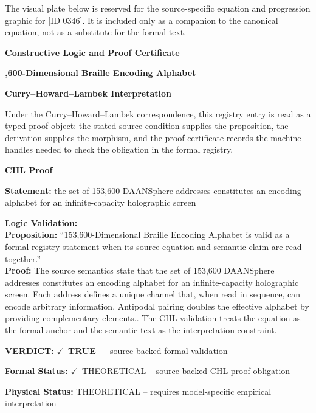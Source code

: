 \begingroup\footnotesize\sloppy
The visual plate below is reserved for the source-specific equation and progression graphic for [ID 0346]. It is included only as a companion to the canonical equation, not as a substitute for the formal text.
\par\endgroup
\ifTZPDarkEdition
{}
\fi

\clearpage
\begingroup\tzpsupportsetup
\noindent\textbf{\fontsize{10.8pt}{12.8pt}\selectfont [ID 0346] Constructive Logic and Proof Certificate}\par
\noindent\textbf{\fontsize{10pt}{12pt},600-Dimensional Braille Encoding Alphabet}\par
\vspace{0.45em}
\begingroup
\footnotesize
\setlength{\parskip}{0.22em}
\setlength{\parindent}{0pt}
\noindent\textbf{Curry--Howard--Lambek Interpretation}\par
Under the Curry--Howard--Lambek correspondence, this registry entry is read as a typed proof
object: the stated source condition supplies the proposition, the derivation supplies the
morphism, and the proof certificate records the machine handles needed to check the obligation
in the formal registry.

\vspace{0.45em}
\noindent\textbf{CHL Proof}\par
\textbf{Statement:} the set of 153,600 DAANSphere addresses constitutes an encoding alphabet for an
infinite-capacity holographic screen

\textbf{Logic Validation:}\\
\textbf{Proposition:} ``153,600-Dimensional Braille Encoding Alphabet is valid as a formal registry statement
when its source equation and semantic claim are read together.''\\
\textbf{Proof:} The source semantics state that the set of 153,600 DAANSphere addresses constitutes an
encoding alphabet for an infinite-capacity holographic screen. Each address defines a
unique channel that, when read in sequence, can encode arbitrary information. Antipodal
pairing doubles the effective alphabet by providing complementary elements.. The CHL
validation treats the equation as the formal anchor and the semantic text as the
interpretation constraint.

\textbf{VERDICT:} \ensuremath{\checkmark}\ \textbf{TRUE} --- source-backed formal validation

\textbf{Formal Status:} \ensuremath{\checkmark}\ THEORETICAL -- source-backed CHL proof obligation

\textbf{Physical Status:} THEORETICAL -- requires model-specific empirical interpretation
\par\vspace{0.45em}
\par
\ifTZPDarkEdition
{}
\fi
\endgroup
\endgroup
